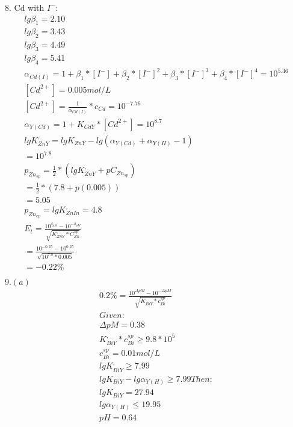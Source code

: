 \documentclass{article}
\begin{document}
8. Cd with $I^{-}$:\\
\begin{equation}
    \begin{multlined}
        lg\beta_1 = 2.10\\
        lg\beta_2 = 3.43\\
        lg\beta_3 = 4.49\\
        lg\beta_4 = 5.41\\
        \alpha_{Cd(I)} = 1 + \beta_1*[I^-] + \beta_2*[I^-]^2 + \beta_3 * [I^-]^3 + \beta_4*[I^-]^4 = 10^{5.46}\\
        [Cd^{2+}] = 0.005 mol/L\\
        [Cd^{2+}] = \frac{1}{\alpha_{Cd(I)}}*c_{Cd} = 10^{-7.76}\\
        \alpha_{Y(Cd)} = 1 + K_{CdY}*[Cd^{2+}] = 10^{8.7}\\
        lgK^{,}_{ZnY} = lgK_{ZnY} - lg(\alpha_{Y(Cd)} + \alpha_{Y(H)} - 1)\\
        =10^{7.8}\\
        p_{Zn}_{sp} = \frac{1}{2}*(lgK^{,}_{ZnY} + pC_{Zn}_{sp})\\
        =\frac{1}{2}*(7.8+ p(0.005))\\
        =5.05\\
        p_{Zn}_{ep} = lg K^{,}_{ZnIn} = 4.8\\
        E_t = \frac{10^{\delta_{pM}}-10^{-\delta_{pM}}}{\sqrt{K^{,}_{ZnY}*C^{sp}_{Zn}}}\\
        =\frac{10^{-0.25} - 10^{0.25}}{\sqrt{10^{7.8}*0.005}}\\
        = -0.22\%\\
    \end{multlined}
\end{equation}
9.$(a)$\\
\begin{equation}
    \begin{multlined}
        0.2\% = \frac{10^{\Delta pM} - 10^{-\Delta pM}}{\sqrt{K^{,}_{BiY}*c^{sp}_{Bi}}}\\
        Given:\\
        \Delta pM = 0.38\\
        K^{,}_{BiY}*c^{sp}_{Bi} \geq 9.8*10^5\\
        c^{sp}_{Bi} = 0.01 mol/L\\
        lg K^{,}_{BiY} \geq 7.99\\
        lg K_{BiY} - lg\alpha_{Y(H)} \geq 7.99
        Then:\\
        lg K_{BiY} = 27.94\\
        lg\alpha_{Y(H)} \leq 19.95\\
        pH = 0.64\\
    \end{multlined}
\end{equation}
\end{document}
